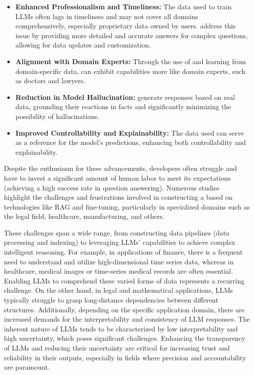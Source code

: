 \begin{itemize}
    \item \textbf{Enhanced Professionalism and Timeliness:} The data used to train LLMs often lags in timeliness and may not cover all domains comprehensively, especially proprietary data owned by users. \MFUsentencecase{\app} address this issue by providing more detailed and accurate answers for complex questions, allowing for data updates and customization.
    
    \item \textbf{Alignment with Domain Experts:} Through the use of and learning from domain-specific data, \app{} can exhibit capabilities more like domain experts, such as doctors and lawyers.
    
    \item \textbf{Reduction in Model Hallucination:} \MFUsentencecase{\app} generate responses based on real data, grounding their reactions in facts and significantly minimizing the possibility of hallucinations.
    
    \item \textbf{Improved Controllability and Explainability:} The data used can serve as a reference for the model's predictions, enhancing both controllability and explainability.
\end{itemize}

Despite the enthusiasm for these advancements, developers often struggle and have to invest a significant amount of human labor to meet its expectations (\eg achieving a high success rate in question answering). Numerous studies~\cite{nie2024survey, huang2024comprehensive, yang2024large, ahn2024large, wang2024large} highlight the challenges and frustrations involved in constructing a \app{} based on technologies like RAG and fine-tuning, particularly in specialized domains such as the legal field, healthcare, manufacturing, and others. 

These challenges span a wide range, from constructing data pipelines (\eg data processing and indexing) to leveraging LLMs' capabilities to achieve complex intelligent reasoning. For example, in applications of finance, there is a frequent need to understand and utilize high-dimensional time series data, whereas in healthcare, medical images or time-series medical records are often essential. Enabling LLMs to comprehend these varied forms of data represents a recurring challenge. On the other hand, in legal and mathematical applications, LLMs typically struggle to grasp long-distance dependencies between different structures. Additionally, depending on the specific application domain, there are increased demands for the interpretability and consistency of LLM responses. The inherent nature of LLMs tends to be characterized by low interpretability and high uncertainty, which poses significant challenges. Enhancing the transparency of LLMs and reducing their uncertainty are critical for increasing trust and reliability in their outputs, especially in fields where precision and accountability are paramount.

